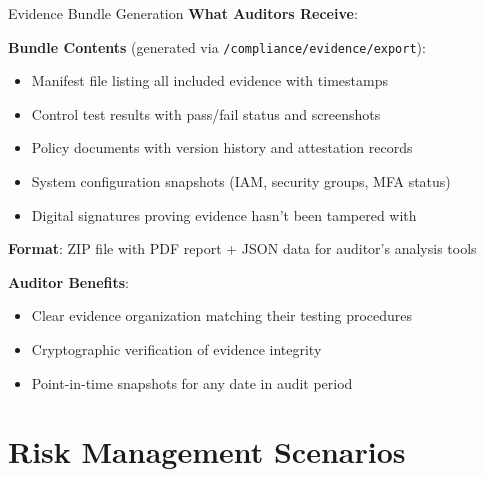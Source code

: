\documentclass[aspectratio=169]{beamer}
\begin{document}
\begin{frame}{Evidence Bundle Generation}
  \textbf{What Auditors Receive}:
  
  \vspace{0.3cm}
  
  \textbf{Bundle Contents} (generated via \texttt{/compliance/evidence/export}):
  \begin{itemize}
    \item Manifest file listing all included evidence with timestamps
    \item Control test results with pass/fail status and screenshots
    \item Policy documents with version history and attestation records
    \item System configuration snapshots (IAM, security groups, MFA status)
    \item Digital signatures proving evidence hasn't been tampered with
  \end{itemize}
  
  \vspace{0.3cm}
  
  \textbf{Format}: ZIP file with PDF report + JSON data for auditor's analysis tools
  
  \vspace{0.3cm}
  
  \textbf{Auditor Benefits}:
  \begin{itemize}
    \item Clear evidence organization matching their testing procedures
    \item Cryptographic verification of evidence integrity
    \item Point-in-time snapshots for any date in audit period
  \end{itemize}
\end{frame}

\section{Risk Management Scenarios}
\end{document}
